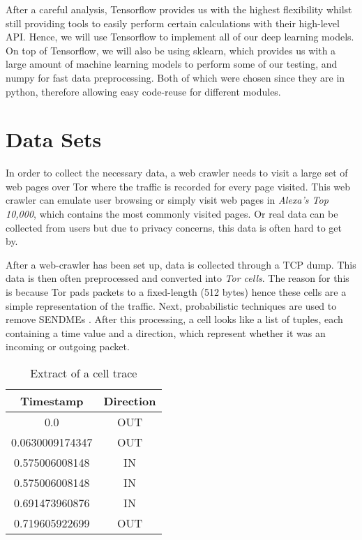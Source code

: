 After a careful analysis, Tensorflow provides us with the highest flexibility whilst still providing tools to easily perform certain calculations with their high-level API.
Hence, we will use Tensorflow to implement all of our deep learning models.
On top of Tensorflow, we will also be using sklearn, which provides us with a large amount of machine learning models to perform some of our testing, and numpy for fast data preprocessing.
Both of which were chosen since they are in python, therefore allowing easy code-reuse for different modules.

\section{Data Sets}

In order to collect the necessary data, a web crawler needs to visit a large set of web pages over Tor where the traffic is recorded for every page visited.
This web crawler can emulate user browsing or simply visit web pages in \textit{Alexa's Top 10,000}, which contains the most commonly visited pages.
Or real data can be collected from users but due to privacy concerns, this data is often hard to get by.

After a web-crawler has been set up, data is collected through a TCP dump.
This data is then often preprocessed and converted into \textit{Tor cells}.
The reason for this is because Tor pads packets to a fixed-length (512 bytes) \cite{tor_project} hence these cells are a simple representation of the traffic.
Next, probabilistic techniques are used to remove SENDMEs \cite{wang_goldberg_2013}.
After this processing, a cell looks like a list of tuples, each containing a time value and a direction, which represent whether it was an incoming or outgoing packet.

\begin{table}[ht]
\centering
  \begin{tabular}{ c | c }
    \textbf{Timestamp} & \textbf{Direction} \\ \hline
      0.0&OUT \\
      0.0630009174347&OUT \\
      0.575006008148&IN \\
      0.575006008148&IN \\
      0.691473960876&IN \\
      0.719605922699&OUT \\
  \end{tabular}
  \caption{Extract of a cell trace \cite{greschbach2016effect}}
  \label{table:cell-extract}
\end{table}

